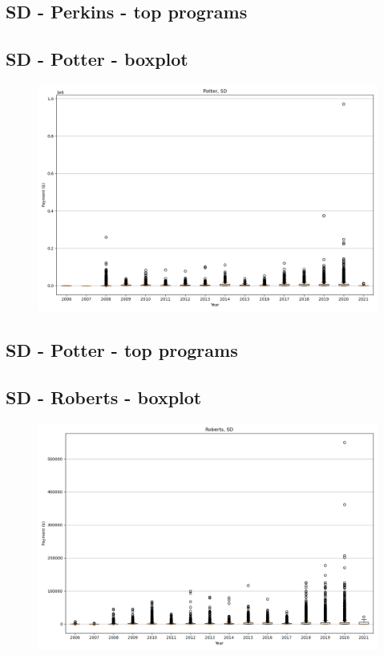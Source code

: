 \subsection*{SD - Perkins - top programs}

\newpage
\subsection*{SD - Potter - boxplot}
\begin{figure}[h]
\centering
\includegraphics[width=7in]{../output/boxplots/counties/Potter-SD_boxplot.png}
\end{figure}


\subsection*{SD - Potter - top programs}

\newpage
\subsection*{SD - Roberts - boxplot}
\begin{figure}[h]
\centering
\includegraphics[width=7in]{../output/boxplots/counties/Roberts-SD_boxplot.png}
\end{figure}


